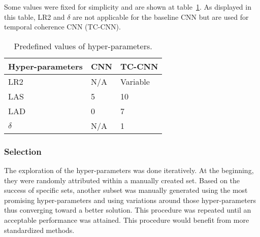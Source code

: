 Some values were fixed for simplicity and are shown at table~\ref{tab:hyperparamsvals}. As displayed in this table, LR2 and $\delta$ are not applicable for the baseline CNN but are used for temporal coherence CNN (TC-CNN).


\begin{table}[ht]
\label{tab:hyperparamsvals}
\begin{center}
\begin{tabular}{lll}

Hyper-parameters & CNN & TC-CNN \\ 
\midrule
LR2 & N/A & Variable \\ 

LAS & 5 & 10 \\ 

LAD & 0 & 7 \\ 

$\delta$ & N/A & 1 \\
\bottomrule
\end{tabular} 
\caption{Predefined values of hyper-parameters.}
\end{center}
\end{table}

\subsubsection{Selection}
The exploration of the hyper-parameters was done iteratively. At the beginning, they were randomly attributed within a manually created set. Based on the success of specific sets, another subset was manually generated using the most promising hyper-parameters and using variations around those hyper-parameters thus converging toward a better solution. This procedure was repeated until an acceptable performance was attained. This procedure would benefit from more standardized methods.  
